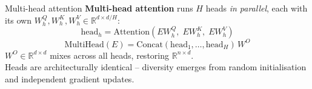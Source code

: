 \documentclass[aspectratio=169,t]{beamer}
\begin{document}
\begin{frame}{Multi-head attention}
  \textbf{Multi-head attention} runs $H$ heads \emph{in parallel}, each with its own $W^Q_h, W^K_h, W^V_h \in \mathbb{R}^{d \times d/H}$:
  \[
    \mathrm{head}_h = \mathrm{Attention}(E W^Q_h,\; E W^K_h,\; E W^V_h)
  \]
  \[
    \mathrm{MultiHead}(E) = \mathrm{Concat}(\mathrm{head}_1, \ldots, \mathrm{head}_H)\,W^O
  \]
  $W^O \in \mathbb{R}^{d \times d}$ mixes across all heads, restoring $\mathbb{R}^{n \times d}$.\\[0.3cm]
  Heads are architecturally identical -- diversity emerges from random initialisation and independent gradient updates.
\end{frame}

\end{document}
